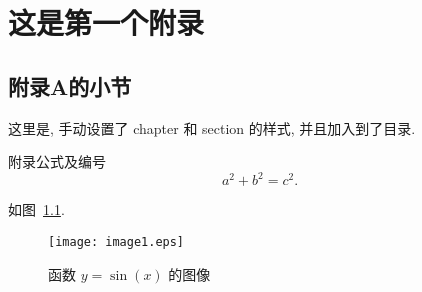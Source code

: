 \documentclass[openany,twoside,12pt]{book}
\makeatletter
\renewcommand{\chaptermark}[1]{\markboth{\thechapter ~ #1}{}}
\renewcommand{\chaptername}{第\arabic{chapter}章}
\renewcommand{\thesection}{\arabic{chapter}.\arabic{section}}
\renewcommand{\chaptermark}[1]{\markboth{\ifnum \value{secnumdepth}>-1
\if@mainmatter \chaptername ~ \fi\fi #1}{}}
\theoremstyle{plain}
\makeatother
\begin{document}

%
%
%
%
%
%





\appendix
\renewcommand{\chaptername}{附录 \Alph{chapter}}
\renewcommand{\thesection}{\Alph{chapter}.\arabic{section}}



\chapter{这是第一个附录}

\section{附录A的小节}

这里是, 手动设置了 chapter 和 section 的样式, 并且加入到了目录.

附录公式及编号
\begin{equation}\label{eq:abc}
  a^2+b^2=c^2.
\end{equation}

如图~\ref{fig:sinx2}.
\begin{figure}[htp!]
  \centering
  \texttt{[image: image1.eps]}
  \caption{函数 $y=\sin(x)$ 的图像}\label{fig:sinx2}
\end{figure}
\end{document}
